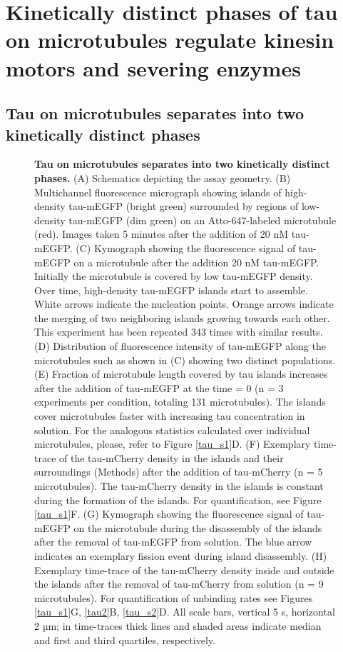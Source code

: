\section{Kinetically distinct phases of tau on microtubules regulate kinesin motors and severing enzymes}
\label{sec:tau}
\subsection{Tau on microtubules separates into two kinetically distinct phases}
\begin{figure}[h!tb]
\centering
\caption[Tau on microtubules separates into two kinetically distinct phases.]{
\textbf{Tau on microtubules separates into two kinetically distinct phases.} (A) Schematics depicting the assay geometry. (B) Multichannel fluorescence micrograph showing islands of high-density tau-mEGFP (bright green) surrounded by regions of low-density tau-mEGFP (dim green) on an Atto-647-labeled microtubule (red). Images taken 5 minutes after the addition of 20 nM tau-mEGFP. (C) Kymograph showing the fluorescence signal of tau-mEGFP on a microtubule after the addition 20 nM tau-mEGFP. Initially the microtubule is covered by low tau-mEGFP density. Over time, high-density tau-mEGFP islands start to assemble. White arrows indicate the nucleation points. Orange arrows indicate the merging of two neighboring islands growing towards each other. This experiment has been repeated 343 times with similar results. (D) Distribution of fluorescence intensity of tau-mEGFP along the microtubules such as shown in (C) showing two distinct populations. (E) Fraction of microtubule length covered by tau islands increases after the addition of tau-mEGFP at the time = 0 (n = 3 experiments per condition, totaling 131 microtubules). The islands cover microtubules faster with increasing tau concentration in solution. For the analogous statistics calculated over individual microtubules, please, refer to Figure \ref{tau_s1}D. (F) Exemplary time-trace of the tau-mCherry density in the islands and their surroundings (Methods) after the addition of tau-mCherry (n = 5 microtubules). The tau-mCherry density in the islands is constant during the formation of the islands. For quantification, see Figure \ref{tau_s1}F. (G) Kymograph showing the fluorescence signal of tau-mEGFP on the microtubule during the disassembly of the islands after the removal of tau-mEGFP from solution. The blue arrow indicates an exemplary fission event during island disassembly. (H) Exemplary time-trace of the tau-mCherry density inside and outside the islands after the removal of tau-mCherry from solution (n = 9 microtubules). For quantification of unbinding rates see Figures \ref{tau_s1}G, \ref{tau2}B, \ref{tau_s2}D. All scale bars, vertical 5 s, horizontal 2 µm; in time-traces thick lines and shaded areas indicate median and first and third quartiles, respectively. 
	}\label{tau1}
\end{figure}
